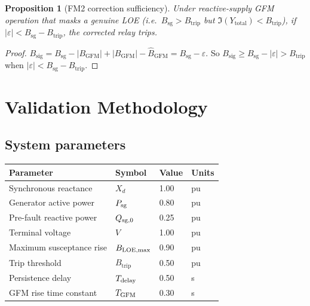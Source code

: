 \documentclass[11pt,a4paper]{article}
\newtheorem{proposition}{Proposition}
\newcommand{\Ytot}{Y_{\mathrm{total}}}
\newcommand{\Btrip}{B_{\mathrm{trip}}}
\newcommand{\Bgfm}{B_{\mathrm{GFM}}}
\begin{document}
\begin{proposition}[FM2 correction sufficiency]
  \label{prop:fm2}
  Under reactive-supply GFM operation that masks a genuine LOE (i.e.\
  $B_{\mathrm{sg}} > \Btrip$ but $\Im(\Ytot) < \Btrip$), if
  $|\varepsilon| < B_{\mathrm{sg}} - \Btrip$, the corrected relay trips.
\end{proposition}

\begin{proof}
  $B_{\mathrm{sig}} = B_{\mathrm{sg}} - |\Bgfm|
  + |\Bgfm| - \widehat{B}_{\mathrm{GFM}} = B_{\mathrm{sg}} - \varepsilon$.
  So $B_{\mathrm{sig}} \geq B_{\mathrm{sg}} - |\varepsilon| > \Btrip$
  when $|\varepsilon| < B_{\mathrm{sg}} - \Btrip$.
\end{proof}

\section{Validation Methodology}
\label{sec:validation}

\subsection{System parameters}
\label{sec:params}

\begin{center}
\begin{tabular}{llll}
  \toprule
  Parameter & Symbol & Value & Units \\
  \midrule
  Synchronous reactance   & $X_d$             & 1.00 & pu \\
  Generator active power  & $P_{\rm sg}$      & 0.80 & pu \\
  Pre-fault reactive power & $Q_{\rm sg,0}$   & 0.25 & pu \\
  Terminal voltage        & $V$               & 1.00 & pu \\
  Maximum susceptance rise & $B_{\rm LOE,max}$ & 0.90 & pu \\
  Trip threshold          & $\Btrip$          & 0.50 & pu \\
  Persistence delay       & $T_{\rm delay}$   & 0.50 & s  \\
  GFM rise time constant  & $T_{\rm GFM}$     & 0.30 & s  \\
  \bottomrule
\end{tabular}
\end{center}
\end{document}
